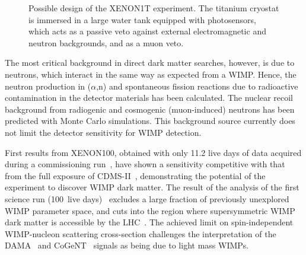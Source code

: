 \begin{figure}[!b]
\centering
{}
\caption[Possible design of the XENON1T experiment]{Possible design of the XENON1T experiment. The titanium cryostat is immersed in a large water tank equipped with photosensors, which acts as a passive veto against external electromagnetic and neutron backgrounds, and as a muon veto.}
\label{figXe1T}
\end{figure}

The most critical background in direct dark matter searches, however, is due to neutrons, which interact in the same way as expected from a WIMP. Hence, the neutron production in ($\alpha$,n) and spontaneous fission reactions due to radioactive contamination in the detector materials has been calculated. The nuclear recoil background from radiogenic and cosmogenic (muon-induced) neutrons has been predicted with Monte Carlo simulations. This background source currently does not limit the detector sensitivity for WIMP detection.

First results from XENON100, obtained with only 11.2 live days of data acquired during a commissioning run~\cite{xe100-run07}, have shown a sensitivity competitive with that from the full exposure of CDMS-II~\cite{CDMS_limit},  demonstrating the potential of the experiment to discover WIMP dark matter. The result of the analysis of the first science run (100~live days)~\cite{xe100-run08} excludes a large fraction of previously unexplored WIMP parameter space, and cuts into the region where supersymmetric WIMP dark matter is accessible by the LHC~\cite{LHC}. The achieved limit on spin-independent WIMP-nucleon scattering cross-section challenges the interpretation of the DAMA~\cite{DAMA_LightWIMP} and CoGeNT~\cite{CoGeNT_LightWIMP} signals as being due to light mass WIMPs.

